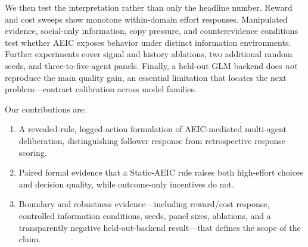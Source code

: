 We then test the interpretation rather than only the headline number.  Reward and cost sweeps show monotone within-domain effort responses.  Manipulated evidence, social-only information, copy pressure, and counterevidence conditions test whether AEIC exposes behavior under distinct information environments.  Further experiments cover signal and history ablations, two additional random seeds, and three-to-five-agent panels.  Finally, a held-out GLM backend does \emph{not} reproduce the main quality gain, an essential limitation that locates the next problem---contract calibration across model families.

Our contributions are:
\begin{enumerate}
  \item A revealed-rule, logged-action formulation of AEIC-mediated multi-agent deliberation, distinguishing follower response from retrospective response scoring.
  \item Paired formal evidence that a Static-AEIC rule raises both high-effort choices and decision quality, while outcome-only incentives do not.
  \item Boundary and robustness evidence---including reward/cost response, controlled information conditions, seeds, panel sizes, ablations, and a transparently negative held-out-backend result---that defines the scope of the claim.
\end{enumerate}
